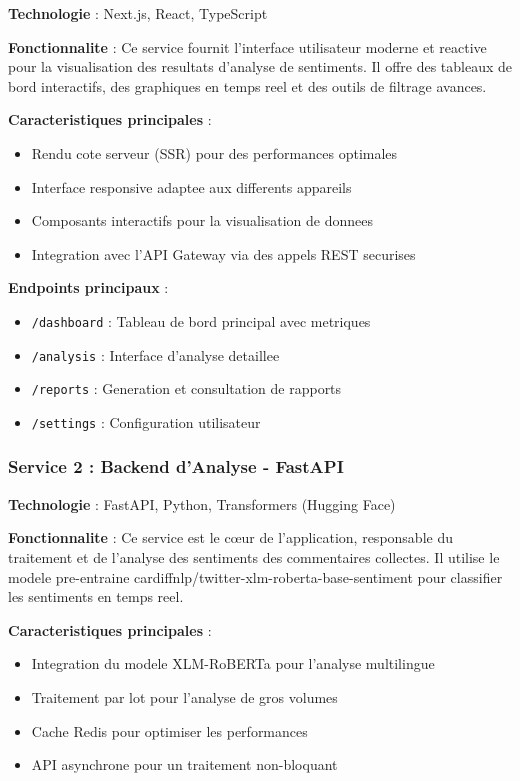 \textbf{Technologie} : Next.js, React, TypeScript

\textbf{Fonctionnalite} : Ce service fournit l'interface utilisateur moderne et reactive pour la visualisation des resultats d'analyse de sentiments. Il offre des tableaux de bord interactifs, des graphiques en temps reel et des outils de filtrage avances.

\textbf{Caracteristiques principales} :
\begin{itemize}
    \item Rendu cote serveur (SSR) pour des performances optimales
    \item Interface responsive adaptee aux differents appareils
    \item Composants interactifs pour la visualisation de donnees
    \item Integration avec l'API Gateway via des appels REST securises
\end{itemize}

\textbf{Endpoints principaux} :
\begin{itemize}
    \item \texttt{/dashboard} : Tableau de bord principal avec metriques
    \item \texttt{/analysis} : Interface d'analyse detaillee
    \item \texttt{/reports} : Generation et consultation de rapports
    \item \texttt{/settings} : Configuration utilisateur
\end{itemize}

\subsubsection{Service 2 : Backend d'Analyse - FastAPI}

\textbf{Technologie} : FastAPI, Python, Transformers (Hugging Face)

\textbf{Fonctionnalite} : Ce service est le cœur de l'application, responsable du traitement et de l'analyse des sentiments des commentaires collectes. Il utilise le modele pre-entraine cardiffnlp/twitter-xlm-roberta-base-sentiment \cite{10} pour classifier les sentiments en temps reel.

\textbf{Caracteristiques principales} :
\begin{itemize}
    \item Integration du modele XLM-RoBERTa pour l'analyse multilingue
    \item Traitement par lot pour l'analyse de gros volumes
    \item Cache Redis pour optimiser les performances
    \item API asynchrone pour un traitement non-bloquant
\end{itemize}


